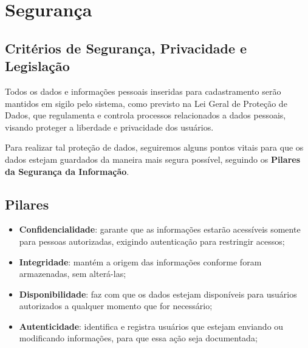\chapter {Segurança}
\section {Critérios de Segurança, Privacidade e Legislação}
Todos os dados e informações pessoais inseridas para cadastramento serão mantidos em sigilo pelo sistema, como previsto na Lei Geral de Proteção de Dados, que regulamenta e controla processos relacionados a dados pessoais, visando proteger a liberdade e privacidade dos usuários.


Para realizar tal proteção de dados, seguiremos alguns pontos vitais para que os dados estejam guardados da maneira mais segura possível, seguindo os \textbf{Pilares da Segurança da Informação}.
\section {Pilares}
\begin{itemize}
\item \textbf{Confidencialidade}: garante que as informações estarão acessíveis somente para pessoas autorizadas, exigindo autenticação para restringir acessos;
\item \textbf{Integridade}: mantém a origem das informações conforme foram armazenadas, sem alterá-las;
\item \textbf{Disponibilidade}: faz com que os dados estejam disponíveis para usuários autorizados a qualquer momento que for necessário;
\item \textbf{Autenticidade}: identifica e registra usuários que estejam enviando ou modificando informações, para que essa ação seja documentada;
\end{itemize}